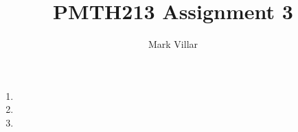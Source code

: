 \documentclass[12pt]{amsart}
\title{PMTH213 \hfill Assignment 3}
\author{Mark Villar}
\begin{document}
 

\maketitle 

\begin{enumerate}
	
	\item
			
	\item 
		
	\item 

\end{enumerate}
\end{document}
